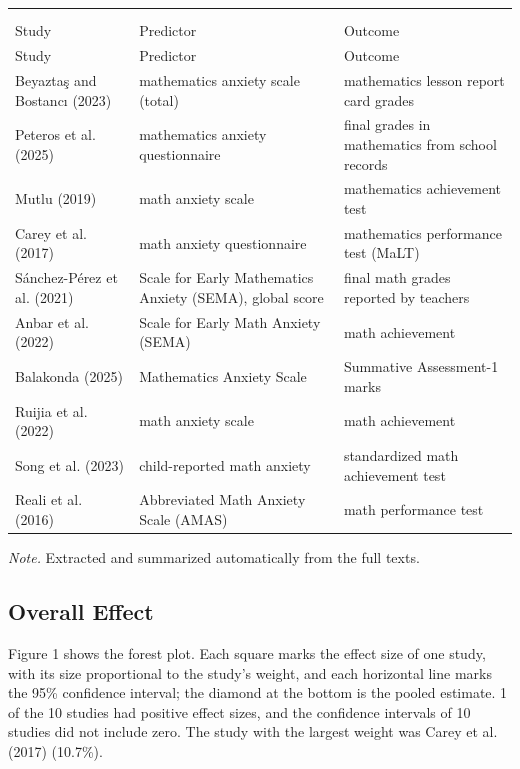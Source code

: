 \documentclass[man,a4paper,12pt,floatsintext,nolmodern,notab]{apa7}
\newcommand{\tablefont}{\small}
\begin{document}
\par\vspace{4pt}
{\tablefont\singlespacing\setlength{\LTpre}{6pt}\setlength{\LTpost}{2pt}
\begin{longtable}{>{\raggedright\arraybackslash}p{0.2400\dimexpr\linewidth-6\tabcolsep\relax}>{\raggedright\arraybackslash}p{0.4000\dimexpr\linewidth-6\tabcolsep\relax}>{\raggedright\arraybackslash}p{0.3600\dimexpr\linewidth-6\tabcolsep\relax}}
\multicolumn{3}{@{}l@{}}{\textbf{Table 2}} \\
\multicolumn{3}{@{}p{\linewidth}@{}}{\textit{Predictors and Outcome Measures}} \\[3pt]
\toprule
Study & Predictor & Outcome \\
\midrule
\endfirsthead
\toprule
Study & Predictor & Outcome \\
\midrule
\endhead
Beyaztaş and Bostancı (2023) & mathematics anxiety scale (total) & mathematics lesson report card grades \\
Peteros et al. (2025) & mathematics anxiety questionnaire & final grades in mathematics from school records \\
Mutlu (2019) & math anxiety scale & mathematics achievement test \\
Carey et al. (2017) & math anxiety questionnaire & mathematics performance test (MaLT) \\
Sánchez-Pérez et al. (2021) & Scale for Early Mathematics Anxiety (SEMA), global score & final math grades reported by teachers \\
Anbar et al. (2022) & Scale for Early Math Anxiety (SEMA) & math achievement \\
Balakonda (2025) & Mathematics Anxiety Scale & Summative Assessment-1 marks \\
Ruijia et al. (2022) & math anxiety scale & math achievement \\
Song et al. (2023) & child-reported math anxiety & standardized math achievement test \\
Reali et al. (2016) & Abbreviated Math Anxiety Scale (AMAS) & math performance test \\
\bottomrule
\end{longtable}
\noindent \textit{Note.} Extracted and summarized automatically from the full texts.\par}
\vspace{6pt}
\subsection{Overall Effect}
Figure 1 shows the forest plot. Each square marks the effect size of one study, with its size proportional to the study’s weight, and each horizontal line marks the 95\% confidence interval; the diamond at the bottom is the pooled estimate. 1 of the 10 studies had positive effect sizes, and the confidence intervals of 10 studies did not include zero. The study with the largest weight was Carey et al. (2017) (10.7\%).
\end{document}
